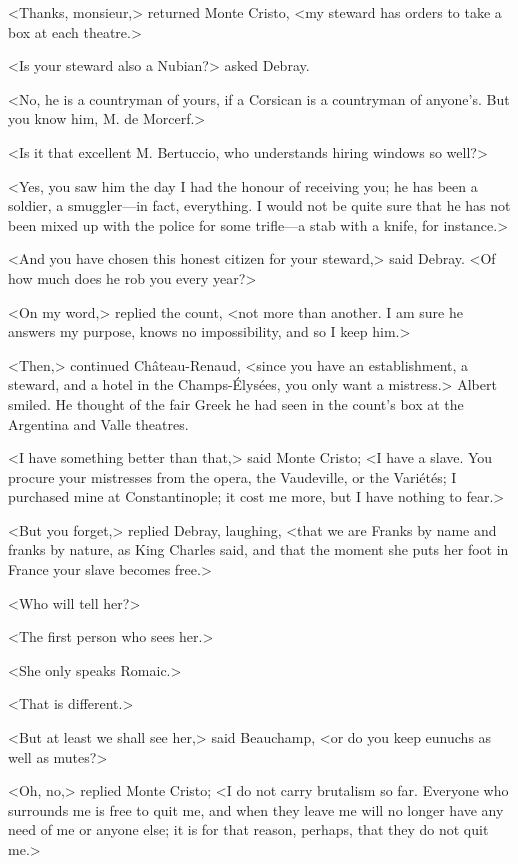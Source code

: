  <Thanks, monsieur,> returned Monte Cristo, <my steward has orders to take a box at each theatre.> 

 <Is your steward also a Nubian?> asked Debray. 

 <No, he is a countryman of yours, if a Corsican is a countryman of anyone's. But you know him, M. de Morcerf.> 

 <Is it that excellent M. Bertuccio, who understands hiring windows so well?> 

 <Yes, you saw him the day I had the honour of receiving you; he has been a soldier, a smuggler—in fact, everything. I would not be quite sure that he has not been mixed up with the police for some trifle—a stab with a knife, for instance.> 

 <And you have chosen this honest citizen for your steward,> said Debray. <Of how much does he rob you every year?> 

 <On my word,> replied the count, <not more than another. I am sure he answers my purpose, knows no impossibility, and so I keep him.> 

 <Then,> continued Château-Renaud, <since you have an establishment, a steward, and a hotel in the Champs-Élysées, you only want a mistress.> Albert smiled. He thought of the fair Greek he had seen in the count's box at the Argentina and Valle theatres. 

 <I have something better than that,> said Monte Cristo; <I have a slave. You procure your mistresses from the opera, the Vaudeville, or the Variétés; I purchased mine at Constantinople; it cost me more, but I have nothing to fear.> 

 <But you forget,> replied Debray, laughing, <that we are Franks by name and franks by nature, as King Charles said, and that the moment she puts her foot in France your slave becomes free.> 

 <Who will tell her?> 

 <The first person who sees her.> 

 <She only speaks Romaic.> 

 <That is different.> 

 <But at least we shall see her,> said Beauchamp, <or do you keep eunuchs as well as mutes?> 

 <Oh, no,> replied Monte Cristo; <I do not carry brutalism so far. Everyone who surrounds me is free to quit me, and when they leave me will no longer have any need of me or anyone else; it is for that reason, perhaps, that they do not quit me.> 

